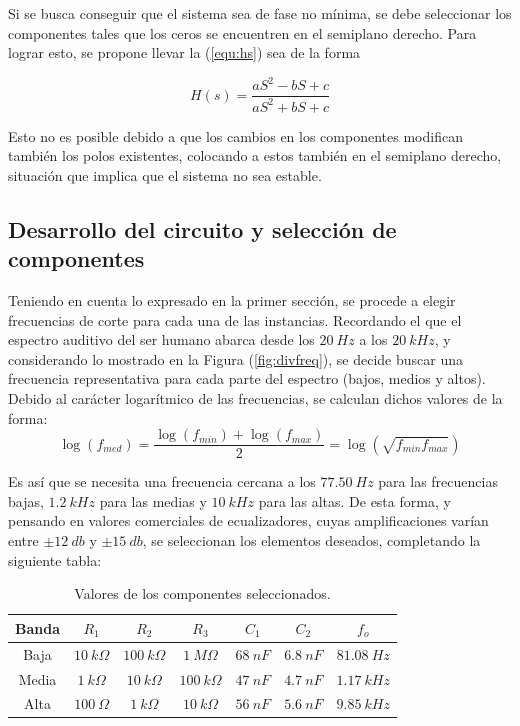\documentclass[a4paper]{article}
\begin{document}
Si se busca conseguir que el sistema sea de fase no mínima, se debe seleccionar los componentes tales que los ceros se encuentren en el semiplano derecho. Para lograr esto, se propone llevar la (\ref{equ:hs}) sea de la forma

\begin{equation*}
	H(s) = \frac{a S^2 - b S + c}{a S^2 + b S + c}
\end{equation*}

Esto no es posible debido a que los cambios en los componentes modifican también los polos existentes, colocando a estos también en el semiplano derecho, situación que implica que el sistema no sea estable. 

\subsection{Desarrollo del circuito y selección de componentes}

Teniendo en cuenta lo expresado en la primer sección, se procede a elegir frecuencias de corte para cada una de las instancias. Recordando el que el espectro auditivo del ser humano abarca desde los $20 \ Hz$ a los $20 \ kHz$, y considerando lo mostrado en la Figura (\ref{fig:divfreq}), se decide buscar una frecuencia representativa para cada parte del espectro (bajos, medios y altos). Debido al carácter logarítmico de las frecuencias, se calculan dichos valores de la forma:
\begin{equation*}
	\log{(f_{med})} = \frac{\log(f_{min}) + \log(f_{max})}{2} = \log(\sqrt{f_{min} f_{max}})
\end{equation*}

Es así que se necesita una frecuencia cercana a los $77.50 \ Hz$ para las frecuencias bajas, $1.2 \ kHz$ para las medias y $10 \ kHz$ para las altas. De esta forma, y pensando en valores comerciales de ecualizadores, cuyas amplificaciones varían entre $\pm 12 \ db$ y $\pm 15 \ db$, se seleccionan los elementos deseados, completando la siguiente tabla:

\begin{table}[H]
\begin{center}
\begin{tabular}{ccccccc}
\hline
Banda & $R_1$ & $R_2$ & $R_3$ & $C_1$ & $C_2$ & $f_o$ \\
\hline
Baja & $10 \ k\Omega$ & $100 \ k\Omega$ & $1 \ M\Omega$ & $68 \ nF$ & $6.8 \ nF$ & $81.08 \ Hz$ \\
Media & $1 \ k\Omega$ & $10 \ k\Omega$ & $100 \ k\Omega$ & $47 \ nF$ & $4.7 \ nF$ & $1.17 \ kHz$ \\
Alta & $100 \ \Omega$ & $1 \ k\Omega$ & $10 \ k\Omega$ & $56 \ nF$ & $5.6 \ nF$ & $9.85 \ kHz$\\
\hline
\end{tabular}
\caption{Valores de los componentes seleccionados.}
\label{tabla:valores}
\end{center}
\end{table}
\end{document}
